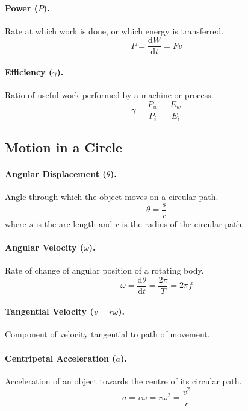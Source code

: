 \documentclass{article}
\begin{document}
\paragraph{Power ($P$).} Rate at which work is done, or which energy is
transferred. \begin{equation} P = \frac{\mathrm{d}W}{\mathrm{d}t} = Fv
\end{equation}

\paragraph{Efficiency ($\gamma$).} Ratio of useful work performed by a machine
or process. \begin{equation} \gamma = \frac{P_w}{P_i} = \frac{E_w}{E_i}
\end{equation}

\subsection{Motion in a Circle}

\paragraph{Angular Displacement ($\theta$).} Angle through which the object
moves on a circular path. \begin{equation} \theta = \frac{s}{r} \end{equation}
  where $s$ is the arc length and $r$ is the radius of the circular path.

\paragraph{Angular Velocity ($\omega$).} Rate of change of angular position of a
rotating body. \begin{equation} \omega = \frac{\mathrm{d}\theta}{\mathrm{d}t} =
\frac{2\pi}{T} = 2\pi f \end{equation}

\paragraph{Tangential Velocity ($v = r\omega$).} Component of velocity
tangential to path of movement.

\paragraph{Centripetal Acceleration ($a$).} Acceleration of an object towards
the centre of its circular path. \begin{equation} a = v\omega = r\omega^2 =
\frac{v^2}{r} \end{equation}
\end{document}
